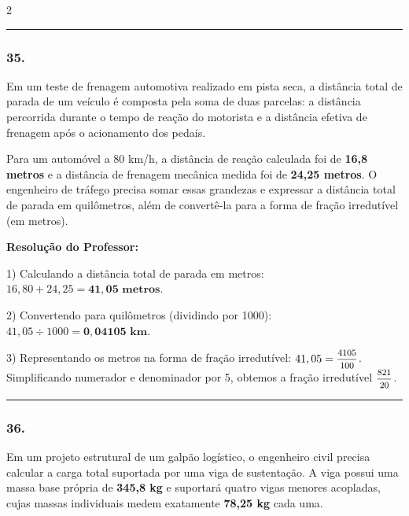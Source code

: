 \begin{multicols*}{2}
\par\vspace{\espacoQuestao}

\noindent\textcolor{CorLinha}{\rule{\linewidth}{0.5pt}} 
\par\vspace{\espacoPreQuestao}
\subsubsection*{35.} Em um teste de frenagem automotiva realizado em pista seca, a distância total de parada de um veículo é composta pela soma de duas parcelas: a distância percorrida durante o tempo de reação do motorista e a distância efetiva de frenagem após o acionamento dos pedais. 

Para um automóvel a 80 km/h, a distância de reação calculada foi de \textbf{16,8 metros} e a distância de frenagem mecânica medida foi de \textbf{24,25 metros}. O engenheiro de tráfego precisa somar essas grandezas e expressar a distância total de parada em quilômetros, além de convertê-la para a forma de fração irredutível (em metros).

\ifgabarito
    \begin{tcolorbox}[colback=CorTitUm!5, colframe=CorTitUm, boxrule=1pt, arc=4pt, left=6pt, right=6pt, top=6pt, bottom=6pt]
    \small\textbf{\textcolor{CorTitUm}{Resolução do Professor:}}\par\vspace{0.1cm}
    \color{CinzaEscuro}
    1) Calculando a distância total de parada em metros:
    $16,80 + 24,25 = \mathbf{41,05\text{ metros}}$.
    
    2) Convertendo para quilômetros (dividindo por 1000):
    $41,05 \div 1000 = \mathbf{0,04105\text{ km}}$.
    
    3) Representando os metros na forma de fração irredutível:
    $41,05 = \mfrac{4105}{100}$. Simplificando numerador e denominador por 5, obtemos a fração irredutível $\mathbf{\mfrac{821}{20}}$.
    \end{tcolorbox}
\fi

\par\vspace{\espacoQuestao}
\noindent\textcolor{CorLinha}{\rule{\linewidth}{0.5pt}} 
\par\vspace{\espacoPreQuestao}
\subsubsection*{36.} Em um projeto estrutural de um galpão logístico, o engenheiro civil precisa calcular a carga total suportada por uma viga de sustentação. A viga possui uma massa base própria de \textbf{345,8 kg} e suportará quatro vigas menores acopladas, cujas massas individuais medem exatamente \textbf{78,25 kg} cada uma.


\end{multicols*}

